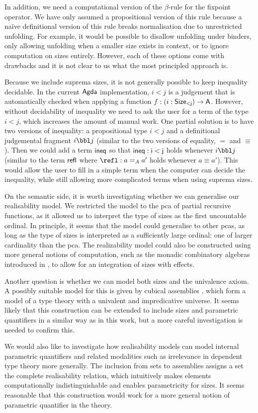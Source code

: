 In addition, we need a computational version of the $\beta$-rule for the fixpoint operator.
We have only assumed a propositional version of this rule because a na\"ive definitional version of this rule breaks normalisation due to unrestricted unfolding.
For example, it would be possible to disallow unfolding under binders, only allowing unfolding when a smaller size exists in context, or to ignore computation on sizes entirely.
However, each of these options come with drawbacks and it is not clear to us what the most principled approach is.

Because we include suprema sizes, it is not generally possible to keep inequality decidable.
In the current \(\sf{Agda}\) implementation, \(i<j\) is a judgement that is automatically checked when applying a function \(f : (i : \sf{Size}_{<j}) \to A\). However, without decidability of inequality we need to ask the user for a term of the type \(i<j\), which increases the amount of manual work.
One partial solution is to have two versions of inequality: a propositional type \(i<j\) and a definitional judgemental fragment \(i\bbl j\) (similar to the two versions of equality, \(=\) and \(\equiv\)).
Then we could add a term \(\sf{ineq}\) so that \(\sf{ineq}:i<j\) holds whenever \(i\bbl j\) (similar to the term \(\sf{refl}\) where \(\refl:a=_Aa'\) holds whenever \(a\equiv a'\)).
This would allow the user to fill in a simple term when the computer can decide the inequality, while still allowing more complicated terms when using suprema sizes.

On the semantic side, it is worth investigating whether we can generalise our realisability model.
We restricted the model to the pca of partial recursive functions, as it allowed us to interpret the type of sizes as the first uncountable ordinal.
In principle, it seems that the model could generalise to other pcas, as long as the type of sizes is interpreted as a sufficiently large ordinal: one of larger cardinality than the pca. The realizability model could also be constructed using more general notions of computation, such as the monadic combinatory algebras introduced in \cite{Cohen-et-al-2025}, to allow for an integration of sizes with effects.

Another question is whether we can model both sizes and the univalence axiom. A possibly suitable model for this is given by cubical assemblies \cite{cubical-assemblies}, which form a model of a type theory with a univalent and impredicative universe. 
It seems likely that this construction can be extended to include sizes and parametric quantifiers in a similar way as in this work, but a more careful investigation is needed to confirm this.

We would also like to investigate how realisability models can model internal parametric quantifiers and related modalities such as irrelevance in dependent type theory more generally.
The inclusion from sets to assemblies assigns a set the complete realisability relation, which intuitively makes elements computationally indistinguishable and enables parametricity for sizes.
It seems reasonable that this construction would work for a more general notion of parametric quantifier in the theory.